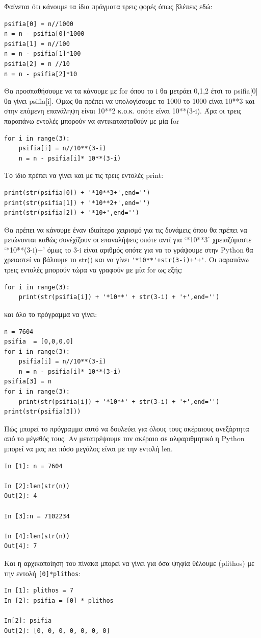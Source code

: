 \documentclass[b5paper,11pt,twoside,openleft]{memoir}
\begin{document}
Φαίνεται ότι κάνουμε τα ίδια πράγματα τρεις φορές όπως βλέπεις εδώ:
\begin{lstlisting}
psifia[0] = n//1000
n = n - psifia[0]*1000
psifia[1] = n//100
n = n - psifia[1]*100
psifia[2] = n //10
n = n - psifia[2]*10
\end{lstlisting}

Θα προσπαθήσουμε να τα κάνουμε με for όπου το i θα μετράει 0,1,2 έτσι το psifia[0] θα γίνει psifia[i]. Όμως θα πρέπει να υπολογίσουμε το 1000 το 1000 είναι 10**3 και στην επόμενη επανάληψη είναι 10**2 κ.ο.κ. οπότε είναι 10**(3-i).
Άρα οι τρεις παραπάνω εντολές μπορούν να αντικατασταθούν με μία for
\begin{lstlisting}
for i in range(3):
    psifia[i] = n//10**(3-i)
    n = n - psifia[i]* 10**(3-i)
\end{lstlisting}

Το ίδιο πρέπει να γίνει και με τις τρεις εντολές print:
\begin{lstlisting}
print(str(psifia[0]) + '*10**3+',end='')
print(str(psifia[1]) + '*10**2+',end='')
print(str(psifia[2]) + '*10+',end='')
\end{lstlisting}
Θα πρέπει να κάνουμε έναν ιδιαίτερο χειρισμό για τις δυνάμεις όπου θα πρέπει να μειώνονται καθώς συνέχίζουν οι επαναλήψεις οπότε αντί για `*10**3΄ χρειαζόμαστε `*10**(3-i)+' όμως το 3-i είναι αριθμός οπότε για να το γράψουμε στην Python θα χρειαστεί να βάλουμε το str() και να γίνει \lstinline{'*10**'+str(3-i)+'+'}. Οι παραπάνω τρεις εντολές μπορούν τώρα να γραφούν με μία for ως εξής:
\begin{lstlisting}
for i in range(3):
    print(str(psifia[i]) + '*10**' + str(3-i) + '+',end='')
\end{lstlisting}
και όλο το πρόγραμμα να γίνει:
\begin{lstlisting}
n = 7604
psifia  = [0,0,0,0]
for i in range(3):
    psifia[i] = n//10**(3-i)
    n = n - psifia[i]* 10**(3-i)
psifia[3] = n
for i in range(3):
    print(str(psifia[i]) + '*10**' + str(3-i) + '+',end='')
print(str(psifia[3]))
\end{lstlisting}

Πώς μπορεί το πρόγραμμα αυτό να δουλεύει για όλους τους ακέραιους ανεξάρτητα από το μέγεθός τους. Αν μετατρέψουμε τον ακέραιο σε αλφαριθμητικό η Python μπορεί να μας πει πόσο μεγάλος είναι με την εντολή len.
\begin{lstlisting}
In [1]: n = 7604

In [2]:len(str(n))
Out[2]: 4

In [3]:n = 7102234

In [4]:len(str(n))
Out[4]: 7
\end{lstlisting}
Και η αρχικοποίηση του πίνακα μπορεί να γίνει για όσα ψηφία θέλουμε (plithos) με την εντολή \lstinline{[0]*plithos}:
\begin{lstlisting}
In [1]: plithos = 7
In [2]: psifia = [0] * plithos

In[2]: psifia
Out[2]: [0, 0, 0, 0, 0, 0, 0]
\end{lstlisting}
\end{document}
